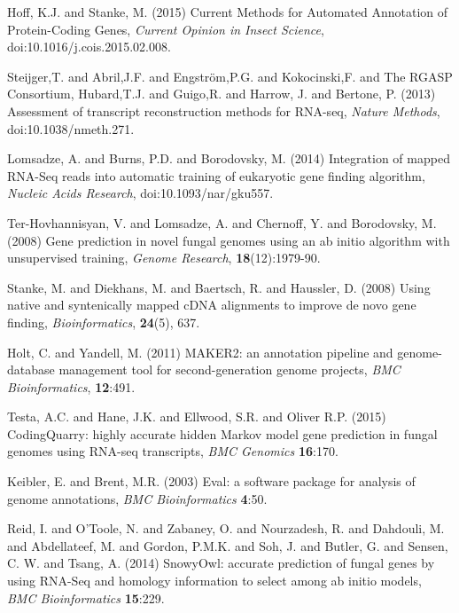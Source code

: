 \documentclass{bioinfo}
\begin{document}
\begin{thebibliography}{}
Hoff, K.J. and Stanke, M. (2015) Current Methods for Automated Annotation of Protein-Coding Genes, {\it Current Opinion in Insect Science}, doi:10.1016/j.cois.2015.02.008.

 Steijger,T. and Abril,J.F. and Engstr\"{o}m,P.G. and Kokocinski,F. and The RGASP Consortium, Hubard,T.J. and Guigo,R. and Harrow, J. and Bertone, P. (2013) Assessment of transcript reconstruction methods for
 RNA-seq, {\it Nature Methods}, doi:10.1038/nmeth.271.

 Lomsadze, A. and Burns, P.D. and Borodovsky, M. (2014) Integration of mapped RNA-Seq reads into automatic training of eukaryotic gene finding algorithm, {\it Nucleic Acids Research}, doi:10.1093/nar/gku557.

 Ter-Hovhannisyan, V. and Lomsadze, A. and Chernoff, Y. and Borodovsky, M. (2008) Gene prediction in novel fungal genomes using an ab initio algorithm with unsupervised training, \textit{Genome Research}, \textbf{18}(12):1979-90.

Stanke, M. and Diekhans, M. and Baertsch, R. and Haussler, D. (2008) Using native and syntenically mapped cDNA alignments to improve de novo gene finding, \textit{Bioinformatics}, \textbf{24}(5), 637.

 Holt, C. and Yandell, M. (2011) MAKER2: an annotation pipeline and genome-database management tool for second-generation genome projects, \textit{BMC Bioinformatics}, \textbf{12}:491.

 Testa, A.C. and Hane, J.K. and Ellwood, S.R. and Oliver R.P. (2015) CodingQuarry: highly accurate hidden Markov model gene prediction in fungal genomes using RNA-seq transcripts, \textit{BMC Genomics} \textbf{16}:170.


 Keibler, E. and Brent, M.R. (2003) Eval: a software package for analysis of genome annotations, \textit{BMC Bioinformatics} \textbf{4}:50.

Reid, I. and O'Toole, N. and Zabaney, O. and Nourzadesh, R. and Dahdouli, M. and Abdellateef, M. and Gordon, P.M.K. and Soh, J. and Butler, G. and Sensen, C. W. and Tsang, A. (2014) SnowyOwl: accurate prediction of fungal genes by using RNA-Seq and homology information to select among ab initio models, \textit{BMC Bioinformatics} \textbf{15}:229.


\end{thebibliography}
\end{document}
